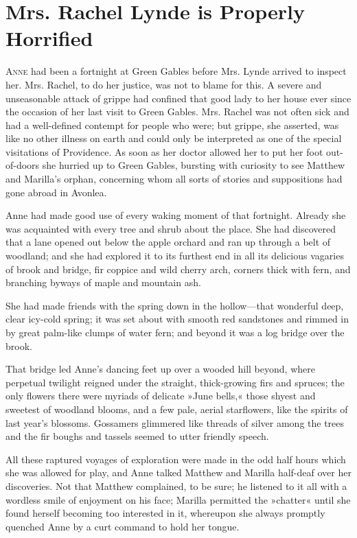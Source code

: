 \chapter{Mrs. Rachel Lynde is Properly Horrified}

\lettrine[lines=4]{A}{nne} had been a fortnight at Green Gables before Mrs. Lynde arrived to inspect her. Mrs. Rachel, to do her justice, was not to blame for this. A severe and unseasonable attack of grippe had confined that good lady to her house ever since the occasion of her last visit to Green Gables. Mrs. Rachel was not often sick and had a well-defined contempt for people who were; but grippe, she asserted, was like no other illness on earth and could only be interpreted as one of the special visitations of Providence. As soon as her doctor allowed her to put her foot out-of-doors she hurried up to Green Gables, bursting with curiosity to see Matthew and Marilla’s orphan, concerning whom all sorts of stories and suppositions had gone abroad in Avonlea.

Anne had made good use of every waking moment of that fortnight. Already she was acquainted with every tree and shrub about the place. She had discovered that a lane opened out below the apple orchard and ran up through a belt of woodland; and she had explored it to its furthest end in all its delicious vagaries of brook and bridge, fir coppice and wild cherry arch, corners thick with fern, and branching byways of maple and mountain ash.

She had made friends with the spring down in the hollow—that wonderful deep, clear icy-cold spring; it was set about with smooth red sandstones and rimmed in by great palm-like clumps of water fern; and beyond it was a log bridge over the brook.

That bridge led Anne’s dancing feet up over a wooded hill beyond, where perpetual twilight reigned under the straight, thick-growing firs and spruces; the only flowers there were myriads of delicate »June bells,« those shyest and sweetest of woodland blooms, and a few pale, aerial starflowers, like the spirits of last year’s blossoms. Gossamers glimmered like threads of silver among the trees and the fir boughs and tassels seemed to utter friendly speech.

All these raptured voyages of exploration were made in the odd half hours which she was allowed for play, and Anne talked Matthew and Marilla half-deaf over her discoveries. Not that Matthew complained, to be sure; he listened to it all with a wordless smile of enjoyment on his face; Marilla permitted the »chatter« until she found herself becoming too interested in it, whereupon she always promptly quenched Anne by a curt command to hold her tongue.

